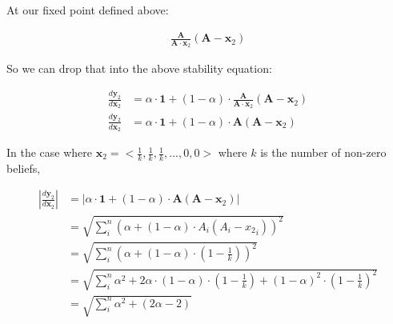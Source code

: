 At our fixed point defined above:

\begin{align*}
    \frac{\mathbf{A}}{\mathbf{A} \cdot \mathbf{x}_2} \left(  \mathbf{A} - \mathbf{x}_2  \right)
\end{align*}

So we can drop that into the above stability equation:

\begin{align*}
    \frac{d \mathbf{y}_2}{d \mathbf{x}_2} &= \alpha \cdot \mathbf{1} + (1 - \alpha) \cdot  \frac{\mathbf{A}}{\mathbf{A} \cdot \mathbf{x}_2} \left(  \mathbf{A} - \mathbf{x}_2  \right)\\
    \frac{d \mathbf{y}_2}{d \mathbf{x}_2} &= \alpha \cdot \mathbf{1} + (1 - \alpha) \cdot  \mathbf{A} \left(  \mathbf{A} - \mathbf{x}_2  \right)
\end{align*}

In the case where $\mathbf{x}_2 = < \frac{1}{k}, \frac{1}{k},\frac{1}{k}, ... , 0, 0 >$ where $k$ is the number of non-zero beliefs, 

\begin{align*}
    |\frac{d \mathbf{y}_2}{d \mathbf{x}_2}| &= |\alpha \cdot \mathbf{1} + (1 - \alpha) \cdot  \mathbf{A} \left(  \mathbf{A} - \mathbf{x}_2  \right)| \\
    &= \sqrt{ \sum_i^n  (\alpha  + (1 - \alpha) \cdot A_i \left( A_i - {x_2}_i  \right))^2 } \\
    &= \sqrt{ \sum_i^n  \left(\alpha  + (1 - \alpha) \cdot \left( 1 - \frac{1}{k}  \right) \right)^2 }\\ 
    &= \sqrt{ \sum_i^n  \alpha^2  + 2 \alpha \cdot (1-\alpha) \cdot  \left( 1 - \frac{1}{k}  \right) + (1 - \alpha)^2 \cdot \left( 1 - \frac{1}{k}  \right)^2}\\ 
    &= \sqrt{ \sum_i^n  \alpha^2 + \left( 2\alpha - 2  \right)  }
\end{align*}